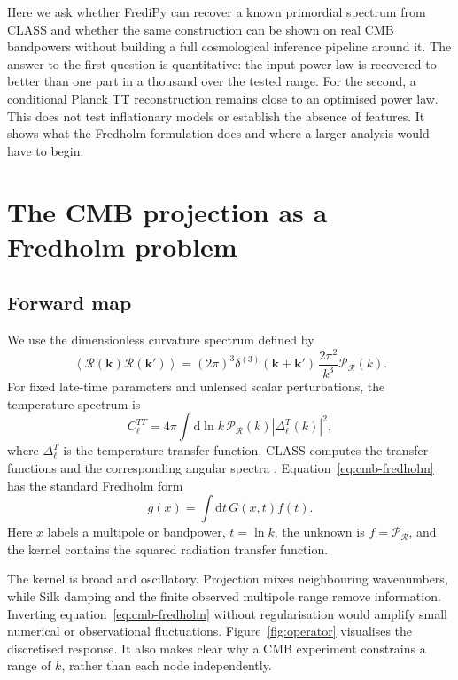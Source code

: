 \documentclass[11pt,a4paper]{article}
\newcommand{\PR}{\mathcal P_{\mathcal R}}
\newcommand{\dd}{\mathrm d}
\begin{document}
Here we ask whether FrediPy can recover a known primordial spectrum from CLASS
and whether the same construction can be
shown on real CMB bandpowers without building a full cosmological inference
pipeline around it.  The answer to the first question is quantitative: the
input power law is recovered to better than one part in a thousand over the
tested range.  For the second, a conditional Planck TT reconstruction remains
close to an optimised power law.  This does not test inflationary models or
establish the absence of features.  It shows what the Fredholm formulation does
and where a larger analysis would have to begin.

\section{The CMB projection as a Fredholm problem}
\label{sec:fredholm}

\subsection{Forward map}

We use the dimensionless curvature spectrum defined by
\begin{equation}
 \left\langle \mathcal R(\bm k)\mathcal R(\bm k')\right\rangle
 = (2\pi)^3\delta^{(3)}(\bm k+\bm k')\,
   \frac{2\pi^2}{k^3}\PR(k).
 \label{eq:pr-definition}
\end{equation}
For fixed late-time parameters and unlensed scalar perturbations, the
temperature spectrum is
\begin{equation}
 C_\ell^{TT}=4\pi\int \dd\ln k\,
 \PR(k)\left|\Delta_\ell^T(k)\right|^2 ,
 \label{eq:cmb-fredholm}
\end{equation}
where $\Delta_\ell^T$ is the temperature transfer function.  CLASS computes
the transfer functions and the corresponding angular spectra
\citep{blas2011}.  Equation~\eqref{eq:cmb-fredholm} has the standard Fredholm
form
\begin{equation}
 g(x)=\int \dd t\,G(x,t)f(t).
 \label{eq:fredholm-generic}
\end{equation}
Here $x$ labels a multipole or bandpower, $t=\ln k$, the unknown is $f=\PR$,
and the kernel contains the squared radiation transfer function.

The kernel is broad and oscillatory.  Projection mixes neighbouring
wavenumbers, while Silk damping and the finite observed multipole range remove
information.  Inverting equation~\eqref{eq:cmb-fredholm} without
regularisation would amplify small numerical or observational fluctuations.
Figure~\ref{fig:operator} visualises the discretised response.  It also makes
clear why a CMB experiment constrains a range of $k$, rather than each node
independently.
\end{document}
